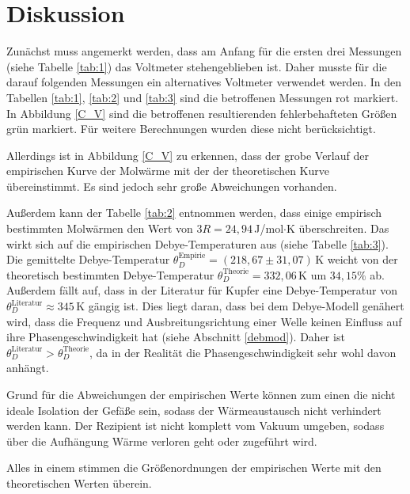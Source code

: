 \section{Diskussion}
Zunächst muss angemerkt werden, dass am Anfang für die ersten drei Messungen (siehe Tabelle \ref{tab:1}) das Voltmeter stehengeblieben ist.
Daher musste für die darauf folgenden Messungen ein alternatives Voltmeter verwendet werden.
In den Tabellen \ref{tab:1}, \ref{tab:2} und \ref{tab:3} sind die betroffenen Messungen rot markiert.
In Abbildung \ref{C_V} sind die betroffenen resultierenden fehlerbehafteten Größen grün markiert.
Für weitere Berechnungen wurden diese nicht berücksichtigt.

Allerdings ist in Abbildung \ref{C_V} zu erkennen,
dass der grobe Verlauf der empirischen Kurve der Molwärme
mit der der theoretischen Kurve übereinstimmt.
Es sind jedoch sehr große Abweichungen vorhanden.

Außerdem kann der Tabelle \ref{tab:2} entnommen werden,
dass einige empirisch bestimmten Molwärmen den Wert von $3R = 24,94$\,J/mol$\cdot$K überschreiten.
Das wirkt sich auf die empirischen Debye-Temperaturen aus (siehe Tabelle \ref{tab:3}).
Die gemittelte Debye-Temperatur $\theta_D^{\text{Empirie}} = (218,67\pm31,07)$\,K
weicht von der theoretisch bestimmten Debye-Temperatur $\theta_D^{\text{Theorie}} = 332,06$\,K
um $34,15\%$ ab.
Außerdem fällt auf, dass in der Literatur für Kupfer eine Debye-Temperatur von $\theta_D^{\text{Literatur}} \approx 345$\,K \cite{debye} gängig ist.
Dies liegt daran, dass bei dem Debye-Modell genähert wird, dass die Frequenz und Ausbreitungsrichtung einer Welle keinen Einfluss auf ihre Phasengeschwindigkeit hat (siehe Abschnitt \ref{debmod}).
Daher ist $\theta_D^{\text{Literatur}} > \theta_D^{\text{Theorie}}$, da in der Realität die Phasengeschwindigkeit sehr wohl davon anhängt.

Grund für die Abweichungen der empirischen Werte können zum einen die nicht ideale Isolation der Gefäße sein,
sodass der Wärmeaustausch nicht verhindert werden kann.
Der Rezipient ist nicht komplett vom Vakuum umgeben, sodass über die Aufhängung Wärme verloren geht oder zugeführt wird.


Alles in einem stimmen die Größenordnungen der empirischen Werte mit den theoretischen Werten überein.

